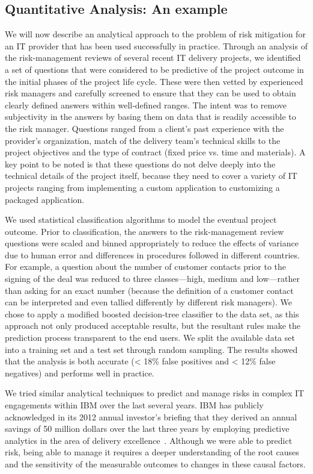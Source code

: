\subsection{Quantitative Analysis: An example}

We will now describe an analytical approach to the problem of risk mitigation
for an IT provider that has been used successfully in practice. Through an
analysis of the risk-management reviews of several recent IT delivery projects,
we identified a set of questions that were considered to be predictive of the
project outcome in the initial phases of the project life cycle. These were then
vetted by experienced risk managers and carefully screened to ensure that they
can be used to obtain clearly defined answers within well-defined ranges. The
intent was to remove subjectivity in the answers by basing them on data that is
readily accessible to the risk manager.  Questions ranged from a client's past
experience with the provider's organization, match of the delivery team's
technical skills to the project objectives and the type of contract (fixed price
vs. time and materials).  A key point to be noted is that these questions do not
delve deeply into the technical details of the project itself, because they need
to cover a variety of IT projects ranging from implementing a custom application
to customizing a packaged application.

We used statistical classification algorithms to model the eventual project
outcome. Prior to classification, the answers to the risk-management review
questions were scaled and binned appropriately to reduce the effects of variance
due to human error and differences in procedures followed in different
countries. For example, a question about the number of customer contacts prior
to the signing of the deal was reduced to three classes---high, medium and
low---rather than asking for an exact number (because the definition of a
customer contact can be interpreted and even tallied differently by different
risk managers). We chose to apply a modified boosted decision-tree classifier to
the data set, as this approach not only produced acceptable results, but the
resultant rules make the prediction process transparent to the end users. We
split the available data set into a training set and a test set through random
sampling. The results showed that the analysis is both accurate (< 18\% false
positives and < 12\% false negatives) and performs well in practice.

We tried similar analytical techniques to predict and manage risks in complex IT
engagements within IBM over the last several years. IBM has publicly
acknowledged in its 2012 annual investor's briefing that they derived an annual
savings of 50 million dollars over the last three years by employing predictive
analytics in the area of delivery
excellence~\cite{ibm-investors-briefing}. Although we were able to predict risk,
being able to manage it requires a deeper understanding of the root causes and
the sensitivity of the measurable outcomes to changes in these causal factors.
